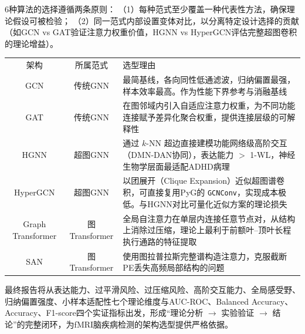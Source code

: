 \documentclass[12pt,a4paper,heading=true,fontset=windows]{ctexart}
\newcommand{\tableheader}[1]{%
  \textcolor{HeaderText}{\heiti #1}%
}
\newcommand{\kw}[1]{{\heiti #1}}
\begin{document}
6种算法的选择遵循两条原则：
（1）每种范式至少覆盖一种代表性方法，确保理论假设可被检验；
（2）同一范式内部设置变体对比，以分离特定设计选择的贡献（如GCN vs GAT验证注意力权重价值，HGNN vs HyperGCN评估完整超图卷积的理论增益）。

\vspace{0.5em}
{\small
    \begin{tabularx}{\textwidth}{c c X}
        \rowcolor{NavyBlue}
        \tableheader{架构}                          & \tableheader{所属范式} & \tableheader{选型理由}                                                                  \\
        \rowcolor{RowGray} \kw{GCN}               & 传统GNN              & 最简基线，各向同性低通滤波，归纳偏置最强，样本效率最高。作为性能下界参考与消融基线                                           \\
        \kw{GAT}                                  & 传统GNN              & 在图邻域内引入自适应注意力权重，为不同功能连接赋予差异化聚合权重，提供连接层级的可解释性                                        \\
        \rowcolor{RowGray} \kw{HGNN}              & 超图GNN              & 通过 $k$-NN 超边直接建模功能网络级高阶交互（DMN-DAN协同），表达能力 $>$ 1-WL，神经生物学层面最适配ADHD病理                 \\
        \kw{HyperGCN}                             & 超图GNN              & 以团展开（Clique Expansion）近似超图谱卷积，可直接复用PyG的 \texttt{GCNConv}，实现成本极低。与HGNN对比可量化近似方案的理论损失 \\
        \rowcolor{RowGray} \kw{Graph Transformer} & 图Transformer       & 全局自注意力在单层内连接任意节点对，从结构上消除过压缩，理论上最利于前额叶--顶叶长程执行通路的特征提取                                \\
        \kw{SAN}                                  & 图Transformer       & 使用图拉普拉斯完整谱构造注意力，克服截断PE丢失高频局部结构的问题                                                   \\
    \end{tabularx}}

\vspace{1em}
最终报告将从\kw{表达能力、过平滑风险、过压缩风险、高阶交互能力、全局感受野、归纳偏置强度、小样本适配性}七个理论维度与\kw{AUC-ROC、Balanced Accuracy、Accuracy、F1-score}四个实证指标出发，形成``理论分析 $\to$ 实验验证 $\to$ 结论''的完整闭环，为fMRI脑疾病检测的架构选型提供严格依据。

\end{document}
